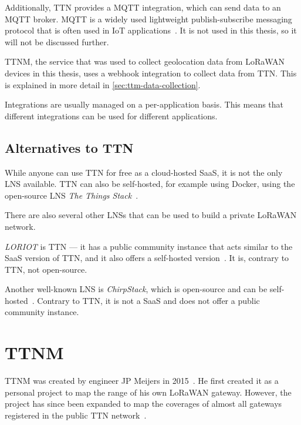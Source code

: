 Additionally, \ac{TTN} provides a MQTT integration, which can send data to an MQTT broker.
MQTT is a widely used lightweight publish-subscribe messaging protocol that is often used in \ac{IoT} applications~\cite{mqtt_mqtt_2022}.
It is not used in this thesis, so it will not be discussed further.

\ac{TTNM}, the service that was used to collect geolocation data from \ac{LoRaWAN} devices in this thesis, uses a webhook integration to collect data from \ac{TTN}.
This is explained in more detail in \cref{sec:ttm-data-collection}.

Integrations are usually managed on a per-application basis.
This means that different integrations can be used for different applications.

\subsection{Alternatives to \acf{TTN}}

While anyone can use \ac{TTN} for free as a cloud-hosted \ac{SaaS}, it is not the only \ac{LNS} available.
\ac{TTN} can also be self-hosted, for example using Docker, using the open-source \ac{LNS} \emph{The Things Stack}~\cite{the_things_network_host_2023}.

There are also several other \acp{LNS} that can be used to build a private \ac{LoRaWAN} network.

\emph{LORIOT} is \ac{TTN} --- it has a public community instance that acts similar to the \ac{SaaS} version of \ac{TTN}, and it also offers a self-hosted version~\cite{loriot_ag_loriot_2023}.
It is, contrary to \ac{TTN}, not open-source.

Another well-known \ac{LNS} is \emph{ChirpStack}, which is open-source and can be self-hosted~\cite{chirpstack_chirpstack_2023}.
Contrary to \ac{TTN}, it is not a \ac{SaaS} and does not offer a public community instance.

\section{\acf{TTNM}}

\acf{TTNM} was created by engineer JP Meijers in 2015~\cite{linkedin_23_nodate}.
He first created it as a personal project to map the range of his own \ac{LoRaWAN} gateway.
However, the project has since been expanded to map the coverages of almost all gateways registered in the public \ac{TTN} network~\cite{the_things_network_jp_2018}.

